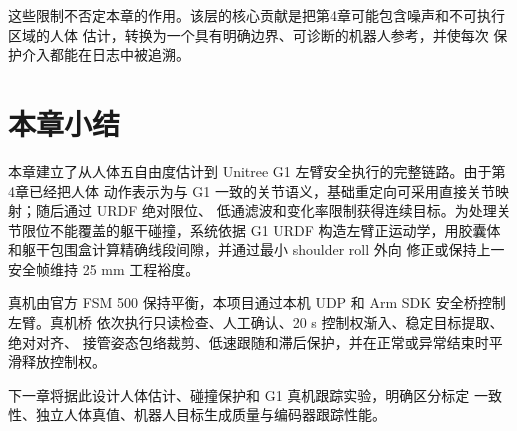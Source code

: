 这些限制不否定本章的作用。该层的核心贡献是把第4章可能包含噪声和不可执行区域的人体
估计，转换为一个具有明确边界、可诊断的机器人参考，并使每次
保护介入都能在日志中被追溯。

\section{本章小结}
\label{sec:ch5_summary}

本章建立了从人体五自由度估计到 Unitree G1 左臂安全执行的完整链路。由于第4章已经把人体
动作表示为与 G1 一致的关节语义，基础重定向可采用直接关节映射；随后通过 URDF 绝对限位、
低通滤波和变化率限制获得连续目标。为处理关节限位不能覆盖的躯干碰撞，系统依据 G1 URDF
构造左臂正运动学，用胶囊体和躯干包围盒计算精确线段间隙，并通过最小 shoulder roll 外向
修正或保持上一安全帧维持 25 mm 工程裕度。

真机由官方 FSM 500 保持平衡，本项目通过本机 UDP 和 Arm SDK 安全桥控制左臂。真机桥
依次执行只读检查、人工确认、20 s 控制权渐入、稳定目标提取、绝对对齐、
接管姿态包络裁剪、低速跟随和滞后保护，并在正常或异常结束时平滑释放控制权。

下一章将据此设计人体估计、碰撞保护和 G1 真机跟踪实验，明确区分标定
一致性、独立人体真值、机器人目标生成质量与编码器跟踪性能。
